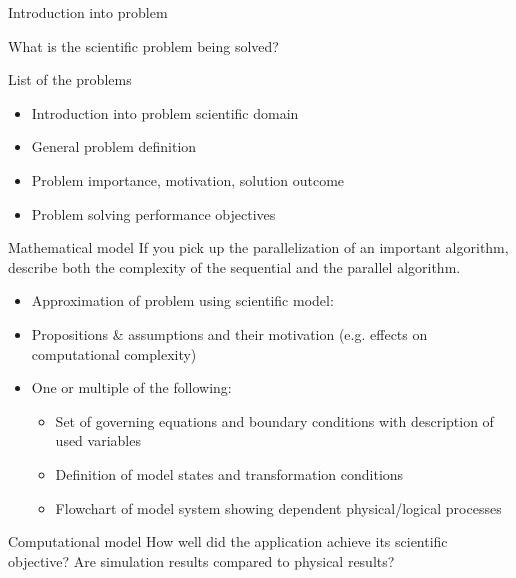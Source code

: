 \documentclass[aspectratio=43]{beamer}
\begin{document}
\begin{frame}[fragile]{Introduction into problem}

What is the scientific problem being solved?
\begin{block}{List of the problems}
    \begin{itemize}
        \item Introduction into problem scientific domain
        \item General problem definition
        \item Problem importance, motivation, solution outcome
        \item Problem solving performance objectives
    \end{itemize}
\end{block}

\end{frame}
\begin{frame}[fragile]{Mathematical model}
If you pick up the parallelization of an important algorithm, describe both the complexity of the sequential and the parallel algorithm.

    \begin{itemize}
        \item Approximation of problem using scientific model:
        \item Propositions \& assumptions and their motivation (e.g. effects on computational complexity)
        \item One or multiple of the following: 
       \begin{itemize}
       \item Set of governing equations and boundary conditions with 
             description of used variables
       \item Definition of model states and transformation conditions
       \item Flowchart of model system showing dependent physical/logical processes
       \end{itemize}
\end{itemize}


\end{frame}
\begin{frame}[fragile]{Computational model}
How well did the application achieve its scientific objective? Are simulation results compared to physical results?
\end{frame}
\end{document}
